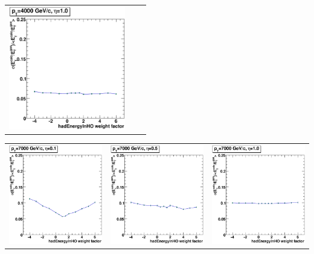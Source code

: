 \documentclass{cmspaper}
\begin{document}
\begin{appendices}
\begin{center}
\begin{tabular}{lll}
 \includegraphics[width=2in]{figs/ET_res_vs_HO_wght_eta1.0_pT4000.eps} \\
\end{tabular}
\end{center}
\begin{center}
\begin{tabular}{lll}
 \includegraphics[width=2in]{figs/ET_res_vs_HO_wght_eta0.1_pT7000.eps} &
 \includegraphics[width=2in]{figs/ET_res_vs_HO_wght_eta0.5_pT7000.eps} &
 \includegraphics[width=2in]{figs/ET_res_vs_HO_wght_eta1.0_pT7000.eps} \\
\end{tabular}
\end{center}

\end{appendices}
\end{document}
